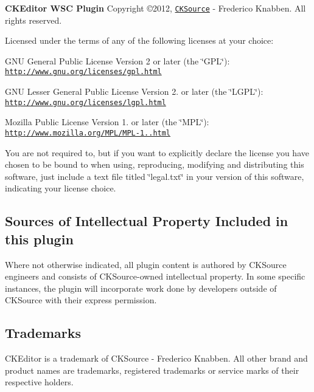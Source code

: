 {\bfseries C\-K\-Editor W\-S\-C Plugin} Copyright \copyright 2012, \href{http://cksource.com}{\tt C\-K\-Source} -\/ Frederico Knabben. All rights reserved.

Licensed under the terms of any of the following licenses at your choice\-:
\begin{DoxyItemize}
\item G\-N\-U General Public License Version 2 or later (the \char`\"{}\-G\-P\-L\char`\"{})\-: \href{http://www.gnu.org/licenses/gpl.html}{\tt http\-://www.\-gnu.\-org/licenses/gpl.\-html}
\item G\-N\-U Lesser General Public License Version 2. or later (the \char`\"{}\-L\-G\-P\-L\char`\"{})\-: \href{http://www.gnu.org/licenses/lgpl.html}{\tt http\-://www.\-gnu.\-org/licenses/lgpl.\-html}
\item Mozilla Public License Version 1. or later (the \char`\"{}\-M\-P\-L\char`\"{})\-: \href{http://www.mozilla.org/MPL/MPL-1.1.html}{\tt http\-://www.\-mozilla.\-org/\-M\-P\-L/\-M\-P\-L-\/1..\-html}
\end{DoxyItemize}

You are not required to, but if you want to explicitly declare the license you have chosen to be bound to when using, reproducing, modifying and distributing this software, just include a text file titled \char`\"{}legal.\-txt\char`\"{} in your version of this software, indicating your license choice.

\subsection*{Sources of Intellectual Property Included in this plugin }

Where not otherwise indicated, all plugin content is authored by C\-K\-Source engineers and consists of C\-K\-Source-\/owned intellectual property. In some specific instances, the plugin will incorporate work done by developers outside of C\-K\-Source with their express permission.

\subsection*{Trademarks }

C\-K\-Editor is a trademark of C\-K\-Source -\/ Frederico Knabben. All other brand and product names are trademarks, registered trademarks or service marks of their respective holders. 